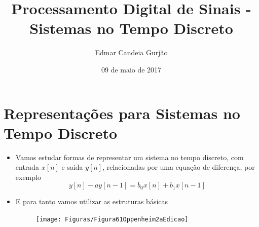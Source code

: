 \documentclass[hyperref={pdfpagelabels=false}]{beamer}
\title[PDS]{Processamento Digital de Sinais - Sistemas no Tempo Discreto}
\author[Edmar Candeia Gurj\~{a}o]{Edmar Candeia Gurj\~{a}o}
\institute[UFCG/CEEI/DEE]{Universidade Federal de Campina Grande}
\date{09 de maio de 2017}
\begin{document}
	
	

\begin{frame}[c, allowframebreaks]
	\titlepage
\end{frame}

\section{Representações para Sistemas no Tempo Discreto}



\begin{frame}[c, allowframebreaks]

\begin{itemize}
\item Vamos estudar formas de representar um sistema no tempo discreto, com entrada $x[n]$ e saída $y[n]$, relacionadas por uma equação de diferença, por exemplo
\[
y[n] - ay[n-1] = b_0x[n] + b_1x[n-1]
\]
\item E para tanto vamos utilizar as estruturas básicas 
\begin{figure}[H]
	\texttt{[image: Figuras/Figura61Oppenheim2aEdicao]}
\end{figure}
\end{itemize}
\end{frame}
\end{document}
